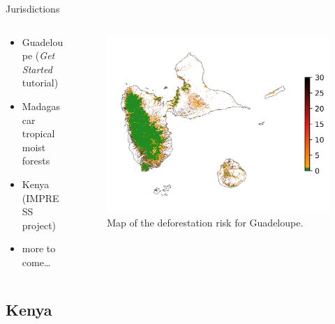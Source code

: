 \documentclass[10pt,table,dvipsnames,compress]{beamer}
\begin{document}
\begin{frame}[label={sec:org8a7c0da}]{Jurisdictions}
\begin{columns}
\begin{column}{0.5\columnwidth}
\begin{itemize}
\item Guadeloupe (\emph{Get Started} tutorial)
\item Madagascar tropical moist forests
\item Kenya (IMPRESS project)
\item more to come\ldots{}
\end{itemize}
\end{column}

\begin{column}{0.5\columnwidth}
\begin{figure}[htbp]
\centering
\includegraphics[width=\textwidth]{figs/riskmap_ws5_ei.png}
\caption{\label{fig:org67a4319}Map of the deforestation risk for Guadeloupe.}
\end{figure}
\end{column}
\end{columns}
\end{frame}

\subsection{Kenya}
\label{sec:orgecc5524}
\end{document}
